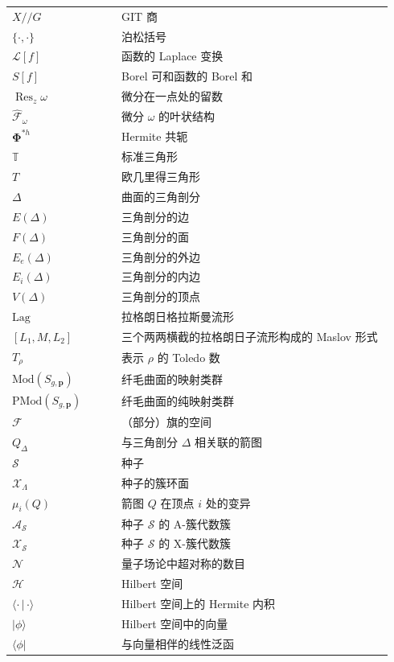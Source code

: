 \begin{longtable}{@{}p{0.27\linewidth}p{0.67\linewidth}@{}}
$X//G$ & GIT 商 \\
$\{\cdot,\cdot\}$ & 泊松括号 \\
$\mathcal{L}[f]$ & 函数的 Laplace 变换 \\
$S[f]$ & Borel 可和函数的 Borel 和 \\
$\operatorname{Res}_z\omega$ & 微分在一点处的留数 \\
$\widehat{\mathcal{F}}_\omega$ & 微分 $\omega$ 的叶状结构 \\
$\boldsymbol{\Phi}^{*h}$ & Hermite 共轭 \\
$\mathbb{T}$ & 标准三角形 \\
$T$ & 欧几里得三角形 \\
$\Delta$ & 曲面的三角剖分 \\
$E(\Delta)$ & 三角剖分的边 \\
$F(\Delta)$ & 三角剖分的面 \\
$E_e(\Delta)$ & 三角剖分的外边 \\
$E_i(\Delta)$ & 三角剖分的内边 \\
$V(\Delta)$ & 三角剖分的顶点 \\
$\mathrm{Lag}$ & 拉格朗日格拉斯曼流形 \\
$[L_1,M,L_2]$ & 三个两两横截的拉格朗日子流形构成的 Maslov 形式 \\
$T_\rho$ & 表示 $\rho$ 的 Toledo 数 \\
$\mathrm{Mod}(S_{g,\mathbf{p}})$ & 纤毛曲面的映射类群 \\
$\mathrm{PMod}(S_{g,\mathbf{p}})$ & 纤毛曲面的纯映射类群 \\
$\mathcal{F}$ & （部分）旗的空间 \\
$Q_\Delta$ & 与三角剖分 $\Delta$ 相关联的箭图 \\
$\mathcal{S}$ & 种子 \\
$\mathcal{X}_\Lambda$ & 种子的簇环面 \\
$\mu_i(Q)$ & 箭图 $Q$ 在顶点 $i$ 处的变异 \\
$\mathcal{A}_{\mathcal{S}}$ & 种子 $\mathcal{S}$ 的 A-簇代数簇 \\
$\mathcal{X}_{\mathcal{S}}$ & 种子 $\mathcal{S}$ 的 X-簇代数簇 \\
$\mathcal{N}$ & 量子场论中超对称的数目 \\
$\mathcal{H}$ & Hilbert 空间 \\
$\langle\cdot\,|\,\cdot\rangle$ & Hilbert 空间上的 Hermite 内积 \\
$|\phi\rangle$ & Hilbert 空间中的向量 \\
$\langle\phi|$ & 与向量相伴的线性泛函 \\

\end{longtable}
